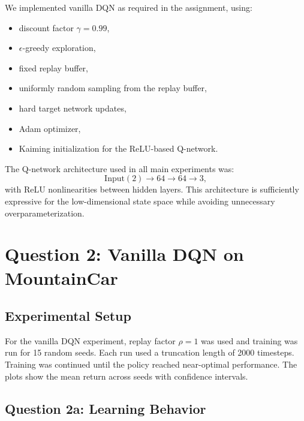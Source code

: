 \documentclass[11pt,a4paper]{article}
\begin{document}
We implemented vanilla DQN as required in the assignment, using:
\begin{itemize}
    \item discount factor \(\gamma = 0.99\),
    \item \(\epsilon\)-greedy exploration,
    \item fixed replay buffer,
    \item uniformly random sampling from the replay buffer,
    \item hard target network updates,
    \item Adam optimizer,
    \item Kaiming initialization for the ReLU-based Q-network.
\end{itemize}

The Q-network architecture used in all main experiments was:
\[
\text{Input}(2) \rightarrow 64 \rightarrow 64 \rightarrow 3,
\]
with ReLU nonlinearities between hidden layers. This architecture is sufficiently expressive for the low-dimensional state space while avoiding unnecessary overparameterization.

\section*{Question 2: Vanilla DQN on MountainCar}

\subsection*{Experimental Setup}

For the vanilla DQN experiment, replay factor \(\rho = 1\) was used and training was run for 15 random seeds. Each run used a truncation length of 2000 timesteps. Training was continued until the policy reached near-optimal performance. The plots show the mean return across seeds with confidence intervals.

\subsection*{Question 2a: Learning Behavior}
\end{document}
